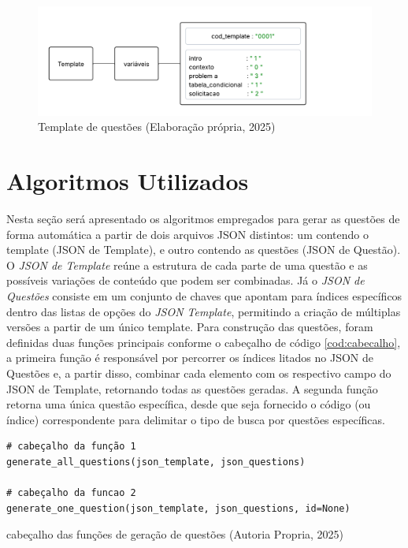 \begin{figure}[ht]
	\centering
	\includegraphics[width=18cm]{./imagens/capitulo5/template-2}
	\caption{Template de questões (Elaboração própria, 2025) }
	\label{fig:template-2}
\end{figure}

\section{Algoritmos Utilizados}

Nesta seção será apresentado os algoritmos empregados para gerar as questões de forma automática a partir de dois arquivos JSON distintos: um contendo o template (JSON de Template), e outro contendo as questões (JSON de Questão). O \textit{JSON de Template} reúne a estrutura de cada parte de uma questão e as possíveis variações de conteúdo que podem ser combinadas. Já o \textit{JSON de Questões} consiste em um conjunto de chaves que apontam para índices específicos dentro das listas de opções do \textit{JSON Template}, permitindo a criação de múltiplas versões a partir de um único template. 
Para construção das questões, foram definidas duas funções principais conforme o cabeçalho de código \ref{cod:cabecalho}, a primeira função é responsável por percorrer os índices litados no JSON de Questões e, a partir disso, combinar cada elemento com os respectivo campo do JSON de Template, retornando todas as questões geradas. A segunda função retorna uma única questão específica, desde que seja fornecido o código (ou índice) correspondente para delimitar o tipo de busca por questões específicas.


\begin{listing}[ht]
\begin{verbatim}
# cabeçalho da função 1
generate_all_questions(json_template, json_questions)

# cabeçalho da funcao 2
generate_one_question(json_template, json_questions, id=None) 
\end{verbatim}
\caption{cabeçalho das funções de geração de questões (Autoria Propria, 2025)}
\label{cod:cabecalho}
\end{listing}


